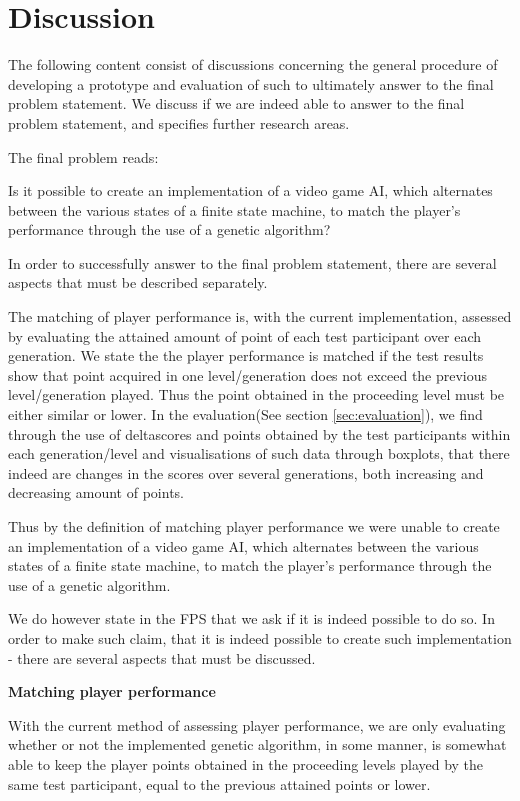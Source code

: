 \section{Discussion} \label{sec:discussion}

The following content consist of discussions concerning the general procedure of developing a prototype and evaluation of such to ultimately answer to the final problem statement. We discuss if we are indeed able to answer to the final problem statement, and specifies further research areas.


The final problem reads:

Is it possible to create an implementation of a video game AI, which alternates between the various states of a finite state machine, to match the player's performance through the use of a genetic algorithm?



In order to successfully answer to the final problem statement, there are several aspects that must be described separately.

The matching of player performance is, with the current implementation, assessed by evaluating the attained amount of point of each test participant over each generation. We state the the player performance is matched if the test results show that point acquired in one level/generation does not exceed the previous level/generation played. Thus the point obtained in the proceeding level must be either similar or lower.
In the evaluation(See section \ref{sec:evaluation}), we find through the use of deltascores and points obtained by the test participants within each generation/level and visualisations of such data through boxplots, that there indeed are changes in the scores over several generations, both increasing and decreasing amount of points.

Thus by the definition of matching player performance we were unable to create an implementation of a video game AI, which alternates between the various states of a finite state machine, to match the player's performance through the use of a genetic algorithm.

We do however state in the FPS that we ask if it is indeed possible to do so. In order to make such claim, that it is indeed possible to create such implementation - there are several aspects that must be discussed.

\textbf{Matching player performance}

With the current method of assessing player performance, we are only evaluating whether or not the implemented genetic algorithm, in some manner, is somewhat able to keep the player points obtained in the proceeding levels played by the same test participant, equal to the previous attained points or lower.


